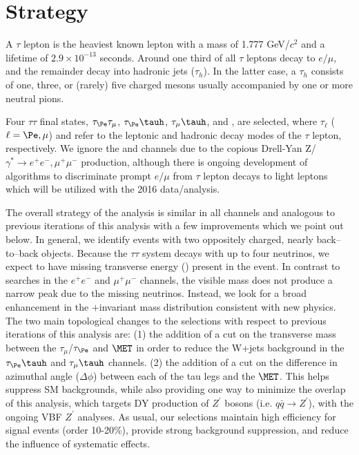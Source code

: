\section{Strategy}\label{sec:strategy}

A $\tau$ lepton is the heaviest known lepton with a mass of 1.777 GeV/$c^2$ and a lifetime of $2.9\times10^{-13}$ seconds. Around one third of
all $\tau$ leptons decay to $e/\mu$, and the remainder decay into hadronic jets ($\tau_{h}$). 
In the latter case, a $\tau_{h}$ consists of one, three, or (rarely) five charged mesons usually accompanied by one or
more neutral pions.


Four $\tau\tau$ final states, $\tau_\Pe \tau_{\mu}$, $\tau_\Pe \tauh$,
$\tau_{\mu} \tauh$, and \ditauhad, are selected, where $\tau_\ell$ ($\ell = \Pe,\mu$) and \tauh
refer to the leptonic and hadronic decay modes of the $\tau$ lepton, respectively.
We ignore the \EE and \MM channels due to the copious Drell-Yan
Z/$\gamma^*\rightarrow e^+e^-, \mu^+\mu^-$ production, although there is ongoing development of algorithms to discriminate prompt $e/\mu$ from $\tau$ lepton 
decays to light leptons which will be utilized with the 2016 data/analysis.

The overall strategy of the analysis is similar in all channels and analogous to previous iterations of this analysis with a few improvements which we point out below. 
In general, we identify events with two oppositely charged, nearly back--to--back objects. Because the $\tau\tau$ system decays with up
to four neutrinos, we expect to have missing transverse energy (\MET) present in the event. In contrast to \zprime searches in the
$e^+e^-$ and $\mu^+\mu^-$ channels, the visible \ditau mass does not produce a narrow peak due to the missing neutrinos.
Instead, we look for a broad enhancement in the \ditau$+$\MET invariant mass distribution consistent with new physics. The two main topological changes to the selections 
with respect to previous iterations of this analysis are: (1) the addition of a cut on the transverse mass between the $\tau_{\mu}$/$\tau_\Pe$ and $\MET$ in order to reduce the W+jets background 
in the $\tau_\Pe \tauh$ and $\tau_{\mu} \tauh$ channels. (2) the addition of a cut on the difference in azimuthal angle ($\Delta \phi$) between each of the tau legs and the $\MET$. This helps 
suppress SM backgrounds, while also providing one way to minimize the overlap of this analysis, which targets DY production of $Z^\prime$ bosons (i.e. $q\bar{q} \to Z^\prime$), with the ongoing 
VBF $Z^\prime$ analyses. As usual, our selections maintain high efficiency for signal events (order 10-20\%), provide strong background suppression, and reduce the influence of systematic
effects.  

